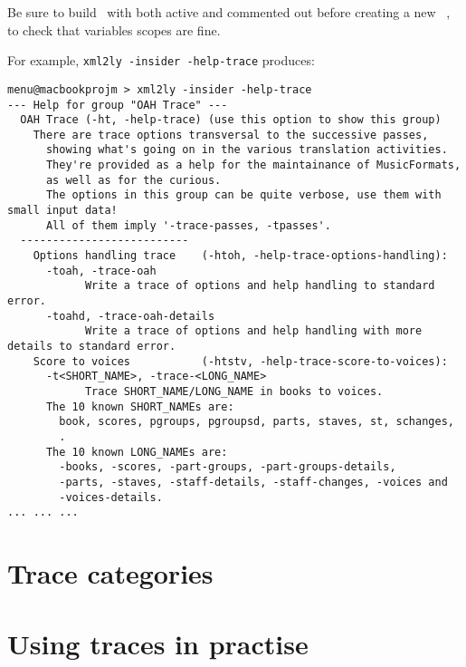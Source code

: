 Be sure to build \mf\ with  both active and commented out before creating a new  \version\ \branch, to check that variables scopes are fine.

For example, {\tt xml2ly -insider -help-trace} produces:
\begin{lstlisting}[language=Terminal]
menu@macbookprojm > xml2ly -insider -help-trace
--- Help for group "OAH Trace" ---
  OAH Trace (-ht, -help-trace) (use this option to show this group)
    There are trace options transversal to the successive passes,
      showing what's going on in the various translation activities.
      They're provided as a help for the maintainance of MusicFormats,
      as well as for the curious.
      The options in this group can be quite verbose, use them with small input data!
      All of them imply '-trace-passes, -tpasses'.
  --------------------------
    Options handling trace    (-htoh, -help-trace-options-handling):
      -toah, -trace-oah
            Write a trace of options and help handling to standard error.
      -toahd, -trace-oah-details
            Write a trace of options and help handling with more details to standard error.
    Score to voices           (-htstv, -help-trace-score-to-voices):
      -t<SHORT_NAME>, -trace-<LONG_NAME>
            Trace SHORT_NAME/LONG_NAME in books to voices.
      The 10 known SHORT_NAMEs are:
        book, scores, pgroups, pgroupsd, parts, staves, st, schanges,
        .
      The 10 known LONG_NAMEs are:
        -books, -scores, -part-groups, -part-groups-details,
        -parts, -staves, -staff-details, -staff-changes, -voices and
        -voices-details.
... ... ...
\end{lstlisting}


\section{Trace categories}

\section{Using traces in practise}

